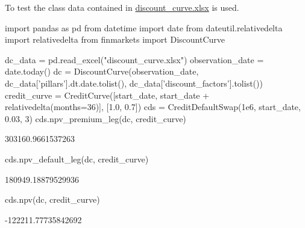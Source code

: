 To test the class data contained in \href{https://github.com/matteosan1/finance_course/blob/develop/libro/input_files/discount_curve.xlsx?raw=true}{discount\_curve.xlsx} is used.

\begin{ipython}
import pandas as pd
from datetime import date
from dateutil.relativedelta import relativedelta
from finmarkets import DiscountCurve

dc_data = pd.read_excel("discount_curve.xlsx")
observation_date = date.today() 
dc = DiscountCurve(observation_date,
dc_data['pillars'].dt.date.tolist(),
dc_data['discount_factors'].tolist())
credit_curve = CreditCurve([start_date,
                            start_date + relativedelta(months=36)],
                            [1.0, 0.7])
cds = CreditDefaultSwap(1e6, start_date, 0.03, 3)
cds.npv_premium_leg(dc, credit_curve)
\end{ipython}
\begin{ioutput}
303160.9661537263
\end{ioutput}

\begin{ipython}
cds.npv_default_leg(dc, credit_curve)
\end{ipython}
\begin{ioutput}
180949.18879529936
\end{ioutput}

\begin{ipython}
cds.npv(dc, credit_curve)
\end{ipython}
\begin{ioutput}
-122211.77735842692
\end{ioutput}
	
